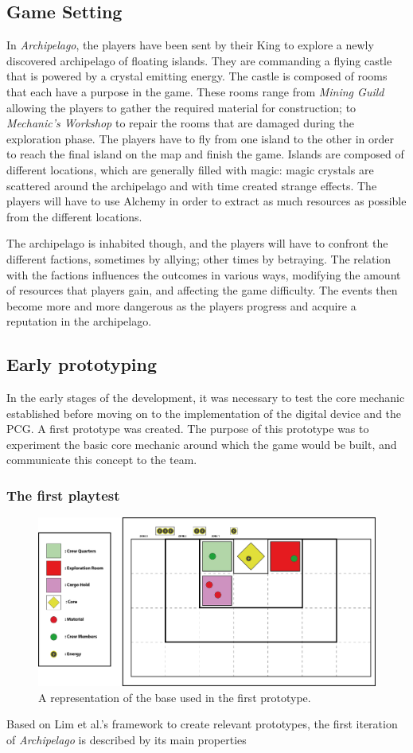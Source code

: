 \subsection{Game Setting}
In \textit{Archipelago}, the players have been sent by their King to explore a newly discovered archipelago of floating islands. They are commanding a flying castle that is powered by a crystal emitting energy. The castle is composed of rooms that each have a purpose in the game. These rooms range from \textit{Mining Guild} allowing the players to gather the required material for construction; to \textit{Mechanic's Workshop} to repair the rooms that are damaged during the exploration phase. The players have to fly from one island to the other in order to reach the final island on the map and finish the game. Islands are composed of different locations, which are generally filled with magic: magic crystals are scattered around the archipelago and with time created strange effects. The players will have to use Alchemy in order to extract as much resources as possible from the different locations. 

The archipelago is inhabited though, and the players will have to confront the different factions, sometimes by  allying; other times by betraying. The relation with the factions influences the outcomes in various ways, modifying the amount of resources that players gain, and affecting the game difficulty. The events then become more and more dangerous as the players progress and acquire a reputation in the archipelago.
\subsection{Early prototyping}
In the early stages of the development, it was necessary to test the core mechanic established before moving on to the implementation of the digital device and the PCG. A first prototype was created. The purpose of this prototype was to experiment the basic core mechanic around which the game would be built, and communicate this concept to the team.
\subsubsection{The first playtest}
\begin{figure}[h]
    \centering
    \includegraphics[scale=0.5]{Images/Board1.png}
    \caption{A representation of the base used in the first prototype.}
    \label{fig:base}
\end{figure}
Based on Lim et al.'s framework to create relevant prototypes, the first iteration of \textit{Archipelago} is described by its main properties

